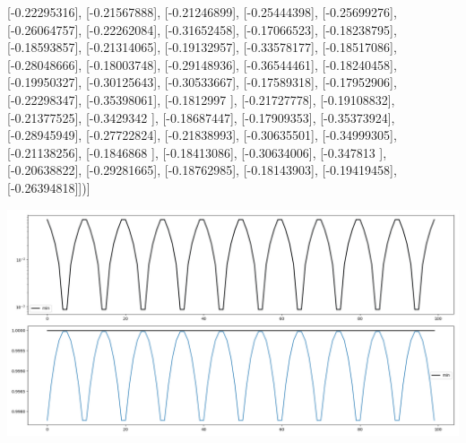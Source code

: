 \documentclass{article}
\begin{document}
       [-0.22295316],
       [-0.21567888],
       [-0.21246899],
       [-0.25444398],
       [-0.25699276],
       [-0.26064757],
       [-0.22262084],
       [-0.31652458],
       [-0.17066523],
       [-0.18238795],
       [-0.18593857],
       [-0.21314065],
       [-0.19132957],
       [-0.33578177],
       [-0.18517086],
       [-0.28048666],
       [-0.18003748],
       [-0.29148936],
       [-0.36544461],
       [-0.18240458],
       [-0.19950327],
       [-0.30125643],
       [-0.30533667],
       [-0.17589318],
       [-0.17952906],
       [-0.22298347],
       [-0.35398061],
       [-0.1812997 ],
       [-0.21727778],
       [-0.19108832],
       [-0.21377525],
       [-0.3429342 ],
       [-0.18687447],
       [-0.17909353],
       [-0.35373924],
       [-0.28945949],
       [-0.27722824],
       [-0.21838993],
       [-0.30635501],
       [-0.34999305],
       [-0.21138256],
       [-0.1846868 ],
       [-0.18413086],
       [-0.30634006],
       [-0.347813  ],
       [-0.20638822],
       [-0.29281665],
       [-0.18762985],
       [-0.18143903],
       [-0.19419458],
       [-0.26394818]])]
\begin{center}
\includegraphics[scale=.9]{report_pickled_controls17/control_dpn_all}

\end{center}
\end{document}

